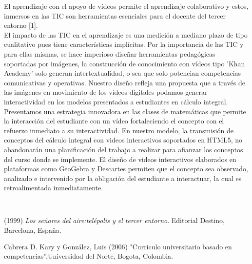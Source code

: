 \begin{titlepage}
\begin{minipage}{0.85\linewidth}
\begin{minipage}{0.85\linewidth}
\begin{resumen}
El aprendizaje con el apoyo de v\'{i}deos permite el aprendizaje colaborativo y estos, inmersos en las TIC son herramientas esenciales para el docente del tercer entorno [1].\\
El impacto de las TIC en el aprendizaje es una medici\'on a mediano plazo de tipo cualitativo pues tiene caracter\'isticas impl\'{i}citas. Por la importancia de las TIC y para ellas mismas, se hace imperioso dise\~nar herramientas pedag\'{o}gicas soportadas por im\'{a}genes, la construcci\'{o}n de conocimiento con v\'{i}deos tipo 'Khan Academy' solo generan intertextualidad, o sea que solo potencian competencias comunicativas y operativas. Nuestro dise\~no refleja una propuesta que a trav\'{e}s de las im\'{a}genes en movimiento de los v\'{i}deos digitales podamos generar interactividad en los modelos presentados a estudiantes en c\'{a}lculo integral.\\
Presentamos una estrategia innovadora en las clases de matem\'{a}ticas que permite la interacci\'{o}n del estudiante con un v\'{i}deo fortaleciendo el concepto con el refuerzo inmediato a su interactividad. En nuestro modelo, la transmisi\'{o}n de conceptos del c\'{a}lculo integral con videos interactivos soportados en HTML5, no abandonar\'{a}n una planificaci\'on del trabajo a realizar para afianzar los conceptos del curso donde se implemente. El dise\~no de videos interactivos elaborados en plataformas como GeoGebra y Descartes permiten que el concepto sea observado, analizado e intervenido por la obligaci\'{o}n del estudiante a interactuar, la cual es retroalimentada inmediatamente. 


    \end{resumen}
\end{minipage}
\vspace*{5pt}\\
\footnotesize
%  
    
\end{minipage}
\vspace{5pt}
\begin{thebibliography}{99}
 (1999) {\it Los se\~nores del aire:tel\'{e}polis y el tercer entorno}.  Editorial Destino, Barcelona, Espa\~na.

 {\sc Cabrera D. Kary y Gonz\'{a}lez, Luis} (2006) "Curriculo universitario basado en competencias''.Universidad del Norte, Bogota, Colombia.
\end{thebibliography}
\end{titlepage}
